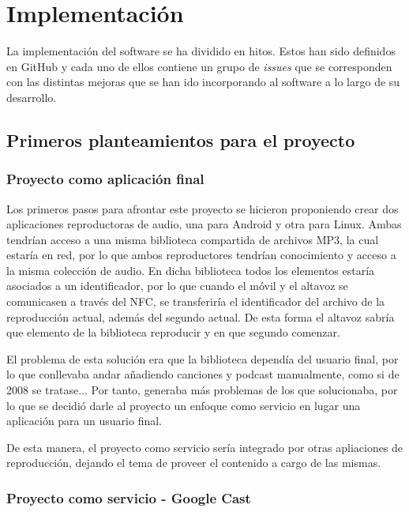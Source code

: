 \chapter{Implementación}

La implementación del software se ha dividido en hitos. Estos han sido definidos en GitHub
y cada uno de ellos contiene un grupo de \textit{issues} que se corresponden con las distintas
mejoras que se han ido incorporando al software a lo largo de su desarrollo.\\

\section{Primeros planteamientos para el proyecto}

\subsection{Proyecto como aplicación final}

Los primeros pasos para afrontar este proyecto se hicieron proponiendo crear dos
aplicaciones reproductoras de audio, una para Android y otra para Linux. Ambas
tendrían acceso a una misma biblioteca compartida de archivos MP3, la cual
estaría en red, por lo que ambos reproductores tendrían conocimiento y acceso a
la misma colección de audio. En dicha biblioteca todos los elementos estaría
asociados a un identificador, por lo que cuando el móvil y el altavoz se
comunicasen a través del NFC, se transferiría el identificador del archivo de la
reproducción actual, además del segundo actual. De esta forma el altavoz sabría
que elemento de la biblioteca reproducir y en que segundo comenzar.

El problema de esta solución era que la biblioteca dependía del usuario final,
por lo que conllevaba andar añadiendo canciones y podcast manualmente, como si
de 2008 se tratase... Por tanto, generaba más problemas de los que solucionaba,
por lo que se decidió darle al proyecto un enfoque como servicio en lugar una
aplicación para un usuario final.

De esta manera, el proyecto como servicio sería integrado por otras apliaciones
de reproducción, dejando el tema de proveer el contenido a cargo de las mismas.

\subsection{Proyecto como servicio - Google Cast}

